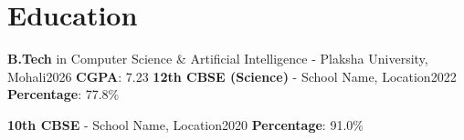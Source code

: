 \section{\textbf{Education}}
\vspace{4pt}
    \resumeSubHeadingListStart

    \educationSubheading
    {\textbf{B.Tech} in Computer Science \& Artificial Intelligence - Plaksha University, Mohali}{2026}
    {\textbf{CGPA}: 7.23}
     \educationSubheading
    {\textbf{12th CBSE (Science)} - School Name, Location}{2022}
    {\textbf{Percentage}: 77.8\%}

    \educationSubheading
    {\textbf{10th CBSE} - School Name, Location}{2020}
    {\textbf{Percentage}: 91.0\%}

    \resumeSubHeadingListEnd
\vspace{-15pt}